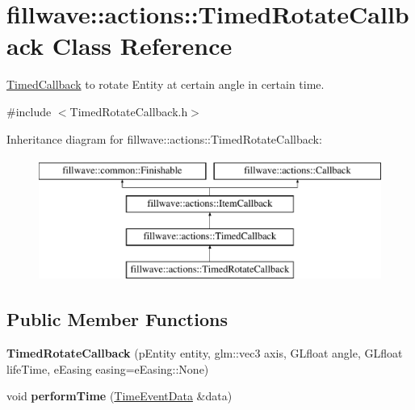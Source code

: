 \hypertarget{classfillwave_1_1actions_1_1TimedRotateCallback}{}\section{fillwave\+:\+:actions\+:\+:Timed\+Rotate\+Callback Class Reference}
\label{classfillwave_1_1actions_1_1TimedRotateCallback}


\hyperlink{classfillwave_1_1actions_1_1TimedCallback}{Timed\+Callback} to rotate Entity at certain angle in certain time.  




{\ttfamily \#include $<$Timed\+Rotate\+Callback.\+h$>$}

Inheritance diagram for fillwave\+:\+:actions\+:\+:Timed\+Rotate\+Callback\+:\begin{figure}[H]
\begin{center}
\leavevmode
\includegraphics[height=4.000000cm]{classfillwave_1_1actions_1_1TimedRotateCallback}
\end{center}
\end{figure}
\subsection*{Public Member Functions}
\begin{DoxyCompactItemize}
\item 
\hypertarget{classfillwave_1_1actions_1_1TimedRotateCallback_acbe48d5452f84f5b41f677b647423f5d}{}{\bfseries Timed\+Rotate\+Callback} (p\+Entity entity, glm\+::vec3 axis, G\+Lfloat angle, G\+Lfloat life\+Time, e\+Easing easing=e\+Easing\+::\+None)\label{classfillwave_1_1actions_1_1TimedRotateCallback_acbe48d5452f84f5b41f677b647423f5d}

\item 
\hypertarget{classfillwave_1_1actions_1_1TimedRotateCallback_a7ada641305e93a9c62451c39fc87c72c}{}void {\bfseries perform\+Time} (\hyperlink{structfillwave_1_1actions_1_1TimeEventData}{Time\+Event\+Data} \&data)\label{classfillwave_1_1actions_1_1TimedRotateCallback_a7ada641305e93a9c62451c39fc87c72c}

\end{DoxyCompactItemize}
